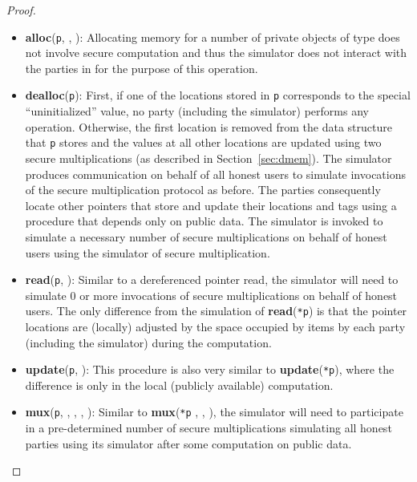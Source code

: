 \documentclass[11pt]{article}
\begin{document}
\begin{proof}
\begin{itemize}
  \item \textbf{alloc}(\texttt{p}, , ): Allocating memory for a
    number  of private objects of type  does not involve secure
    computation and thus the simulator does not interact with the parties in
     for the purpose of this operation. 
    
  \item \textbf{dealloc}(\texttt{p}): First, if one of the locations stored
    in \texttt{p} corresponds to the special ``uninitialized'' value, no
    party (including the simulator) performs any operation. Otherwise, the
    first location  is removed from the data structure that
    \texttt{p} stores and the values at all other locations are updated
    using two secure multiplications (as described in
    Section~\ref{sec:dmem}). The simulator produces communication on behalf
    of all honest users to simulate invocations of the secure multiplication
    protocol as before. The parties consequently locate other pointers that
    store  and update their locations and tags using a procedure
    that depends only on public data. The simulator is invoked to simulate
    a necessary number of secure multiplications on behalf of honest users
    using the simulator of secure multiplication.
    
  \item \textbf{read}(\texttt{p}, ): Similar to a dereferenced pointer
    read, the simulator will need to simulate 0 or more invocations of
    secure multiplications on behalf of honest users. The only difference
    from the simulation of \textbf{read}(\texttt{*p}) is that the pointer
    locations are (locally) adjusted by the space occupied by  items by
    each party (including the simulator) during the computation.
    
  \item \textbf{update}(\texttt{p}, ): This procedure is also very
    similar to \textbf{update}(\texttt{*p}), where the difference is only in
    the local (publicly available) computation. 
    
  \item \textbf{mux}(\texttt{p}, , , , ): Similar to
    \textbf{mux}(\texttt{*p} , , ), the simulator will need
    to participate in a pre-determined number of secure multiplications
    simulating all honest parties using its simulator after some computation
    on public data.
    

\end{itemize}
\end{proof}
\end{document}
